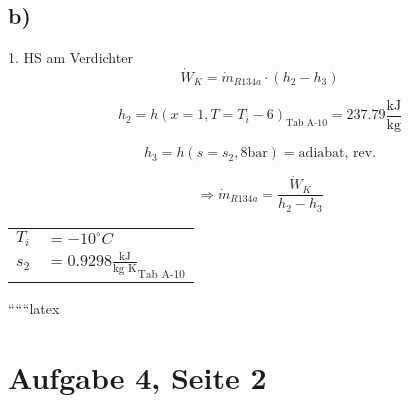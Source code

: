 

\subsection*{b)}

1. HS am Verdichter
\[
\dot{W}_K = \dot{m}_{R134a} \cdot (h_2 - h_3)
\]

\[
h_2 = h \left( x = 1, T = T_i - 6 \right)_{\text{Tab A-10}} = 237.79 \frac{\text{kJ}}{\text{kg}}
\]

\[
h_3 = h \left( s = s_2, 8 \text{bar} \right) = \text{adiabat, rev.}
\]

\[
\Rightarrow \dot{m}_{R134a} = \frac{\dot{W}_K}{h_2 - h_3}
\]

\begin{flushright}
\begin{tabular}{rl}
$T_i$ & $= -10^\circ C$ \\
$s_2$ & $= 0.9298 \frac{\text{kJ}}{\text{kg K}}_{\text{Tab A-10}}$ \\
\end{tabular}
\end{flushright}

``````latex


\section*{Aufgabe 4, Seite 2}